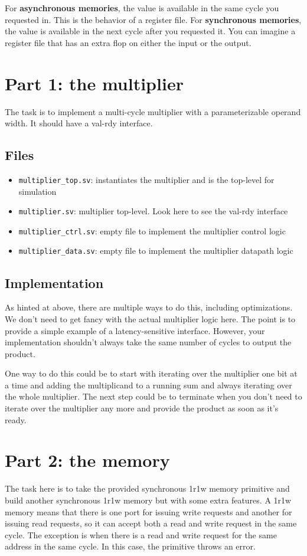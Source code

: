 \documentclass{article}
\begin{document}
For \textbf{asynchronous memories}, the value is available in the same cycle you
requested in. This is the behavior of a register file. For \textbf{synchronous
memories}, the value is available in the next cycle after you requested it. You
can imagine a register file that has an extra flop on either the input or the
output.

\section*{Part 1: the multiplier}
The task is to implement a multi-cycle multiplier with a parameterizable operand
width. It should have a val-rdy interface. 
\subsection*{Files}
\begin{itemize}
    \item \texttt{multiplier\_top.sv}: instantiates the multiplier and is the
    top-level for simulation
    \item \texttt{multiplier.sv}: multiplier top-level. Look here to see the
    val-rdy interface
    \item \texttt{multiplier\_ctrl.sv}: empty file to implement the multiplier
    control logic
    \item \texttt{multiplier\_data.sv}: empty file to implement the multiplier
    datapath logic
\end{itemize}

\subsection*{Implementation}
As hinted at above, there are multiple ways to do this, including optimizations.
We don't need to get fancy with the actual multiplier logic here. The point is
to provide a simple example of a latency-sensitive interface. However, your
implementation shouldn't always take the same number of cycles to output the
product.

One way to do this could be to start with iterating over the multiplier one bit
at a time and adding the multiplicand to a running sum and always iterating over
the whole multiplier. The next step could be to terminate when you don't need to
iterate over the multiplier any more and provide the product as soon as it's
ready. 

\section*{Part 2: the memory}
The task here is to take the provided synchronous 1r1w memory primitive and
build another synchronous 1r1w memory but with some extra features. A 1r1w
memory means that there is one port for issuing write requests and another for
issuing read requests, so it can accept both a read and write request in the
same cycle. The exception is when there is a read and write request for the same
address in the same cycle. In this case, the primitive throws an error.
\end{document}
